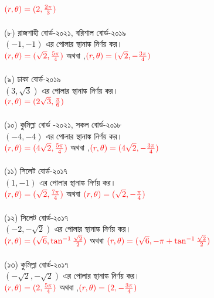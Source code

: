 \documentclass{article}
\begin{document}
	$\textcolor{red}{(r,\theta)=(2,\frac{2\pi}{3})}$\\
	\\
	(৮) রাজশাহী বোর্ড-২০২১, বরিশাল বোর্ড-২০১৯\\
	$(-1,-1)$ এর পোলার স্থানাঙ্ক নির্ণয় কর।\\
	$\textcolor{red}{(r,\theta)=(\sqrt{2},\frac{5\pi}{4})}$ অথবা ,\qquad $\textcolor{red}{(r,\theta)=(\sqrt{2},-\frac{3\pi}{4})}$\\
	\\
	(৯) ঢাকা বোর্ড-২০১৯\\
	$(3,\sqrt{3})$ এর পোলার স্থানাঙ্ক নির্ণয় কর। \\
	$\textcolor{red}{(r,\theta)=(2\sqrt{3},\frac{\pi}{6})}$\\
	\\
	(১০) কুমিল্লা বোর্ড -২০২১, সকল বোর্ড-২০১৮\\
	$(-4,-4)$ এর পোলার স্থানাঙ্ক নির্ণয় কর। \\
	$\textcolor{red}{(r,\theta)=(4\sqrt{2},\frac{5\pi}{4})}$ অথবা ,\qquad $\textcolor{red}{(r,\theta)=(4\sqrt{2},-\frac{3\pi}{4})}$\\
	\\
	(১১) সিলেট বোর্ড-২০১৭\\
	$(1,-1)$ এর পোলার স্থানাঙ্ক নির্ণয় কর। \\ 
	$\textcolor{red}{(r,\theta)=(\sqrt{2},\frac{7\pi}{4})}$ অথবা  $\textcolor{red}{(r,\theta)=(\sqrt{2},-\frac{\pi}{4})}$\\
	\\  
	(১২) সিলেট বোর্ড-২০১৭\\
	$(-2,-\sqrt{2})$ এর পোলার স্থানাঙ্ক নির্ণয় কর। \\
	$\textcolor{red}{(r,\theta)=(\sqrt{6},\tan^{-1}\frac{\sqrt{2}}{2})}$ অথবা $\textcolor{red}{(r,\theta)=(\sqrt{6},-\pi+\tan^{-1}\frac{\sqrt{2}}{2})}$\\
	\\
	(১৩) কুমিল্লা বোর্ড-২০১৭\\
	$(-\sqrt{2},-\sqrt{2})$ এর পোলার স্থানাঙ্ক নির্ণয় কর। \\ 
	$\textcolor{red}{(r,\theta)=(2,\frac{5\pi}{4})}$ অথবা ,\qquad $\textcolor{red}{(r,\theta)=(2,-\frac{3\pi}{4})}$  
	
\end{document}
